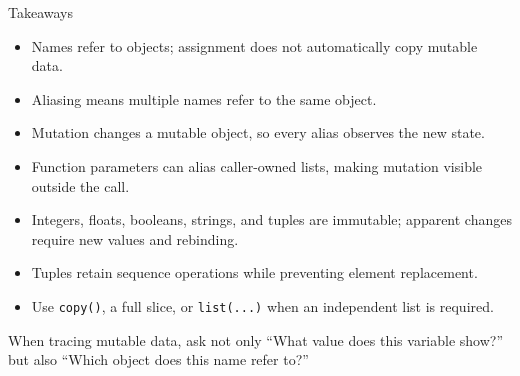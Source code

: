 \documentclass[aspectratio=169,10pt]{beamer}
\begin{document}
\begin{frame}{Takeaways}
  \begin{itemize}
    \item Names refer to objects; assignment does not automatically copy mutable data.
    \item Aliasing means multiple names refer to the same object.
    \item Mutation changes a mutable object, so every alias observes the new state.
    \item Function parameters can alias caller-owned lists, making mutation visible outside the call.
    \item Integers, floats, booleans, strings, and tuples are immutable; apparent changes require new values and rebinding.
    \item Tuples retain sequence operations while preventing element replacement.
    \item Use \texttt{copy()}, a full slice, or \texttt{list(...)} when an independent list is required.
  \end{itemize}

  \begin{keyidea}
    When tracing mutable data, ask not only ``What value does this variable show?'' but also ``Which object does this name refer to?''
  \end{keyidea}
\end{frame}
\end{document}
